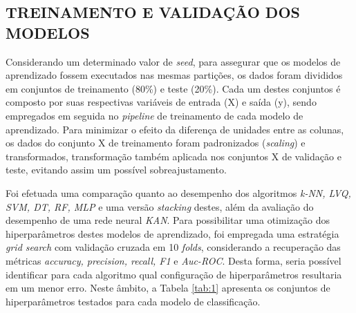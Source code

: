 \documentclass[journal]{IEEEtran}
\begin{document}
\subsection{TREINAMENTO E VALIDAÇÃO DOS MODELOS}
Considerando um determinado valor de \textit{seed}, para assegurar que os modelos de aprendizado fossem executados nas mesmas partições, os dados foram divididos em conjuntos de treinamento (80\%) e teste (20\%). Cada um destes conjuntos é composto por suas respectivas variáveis de entrada (X) e saída (y), sendo empregados em seguida no \textit{pipeline} de treinamento de cada modelo de aprendizado. Para minimizar o efeito da diferença de unidades entre as colunas, os dados do conjunto X de treinamento foram padronizados (\textit{scaling}) e transformados, transformação também aplicada nos conjuntos X de validação e teste, evitando assim um possível sobreajustamento.

Foi efetuada uma comparação quanto ao desempenho dos algoritmos \textit{k-NN, LVQ, SVM, DT, RF, MLP} e uma versão \textit{stacking} destes, além da avaliação do desempenho de uma rede neural \textit{KAN}. Para possibilitar uma otimização dos hiperparâmetros destes modelos de aprendizado, foi empregada uma estratégia \textit{grid search} com validação cruzada em 10 \textit{folds}, considerando a recuperação das métricas \textit{accuracy, precision, recall, F1} e \textit{Auc-ROC}. Desta forma, seria possível identificar para cada algoritmo qual configuração de hiperparâmetros resultaria em um menor erro. Neste âmbito, a Tabela \ref{tab:1} apresenta os conjuntos de hiperparâmetros testados para cada modelo de classificação.
\end{document}
